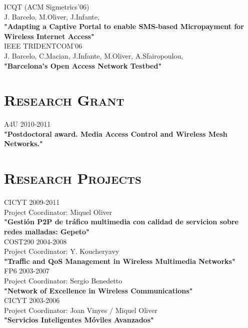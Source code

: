 \documentclass[line,margin]{res}
\begin{document}
\begin{resume}
\hfill {ICQT (ACM Sigmetrics'06)} \\
J. Barcelo, M.Oliver, J.Infante,\\
\textbf{"Adapting a Captive Portal to enable SMS-based Micropayment for Wireless Internet Access"}\\

\hfill {IEEE TRIDENTCOM'06} \\
J. Barcelo, C.Macian, J.Infante, M.Oliver, A.Sfairopoulou,\\
\textbf{"Barcelona's Open Access Network Testbed"}\\

\newpage
\section{\textsc{Research Grant}}

\hfill {A4U 2010-2011} \\
\textbf{"Postdoctoral award. Media Access Control and Wireless Mesh Networks."}\\

\section{\textsc{Research Projects}}

\hfill {CICYT 2009-2011} \\
Project Coordinator: Miquel Oliver\\
\textbf{"Gestión P2P de tráfico multimedia con calidad de servicion sobre redes malladas: Gepeto"}\\

\hfill {COST290 2004-2008} \\
Project Coordinator: Y. Koucheryavy\\
\textbf{"Traffic and QoS Management in Wireless Multimedia Networks"}\\

\hfill {FP6 2003-2007} \\
Project Coordinator: Sergio Benedetto\\
\textbf{"Network of Excellence in Wireless Communications"}\\

\hfill {CICYT 2003-2006} \\
Project Coordinator: Joan Vinyes / Miquel Oliver\\
\textbf{"Servicios Inteligentes Móviles Avanzados"}\\


\end{resume}
\end{document}
